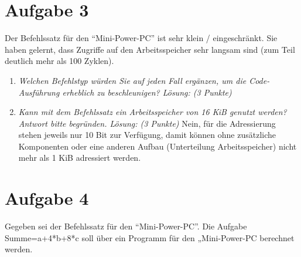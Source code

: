 \documentclass[10pt]{article}
\begin{document}
\section*{Aufgabe 3}
Der Befehlssatz für den "`Mini-Power-PC"' ist sehr klein / eingeschränkt. Sie haben gelernt, dass Zugriffe auf den Arbeitsspeicher sehr langsam sind (zum Teil deutlich mehr als 100 Zyklen).

\begin{enumerate}[label=\alph*)]
	\item
		\textit{Welchen Befehlstyp würden Sie auf jeden Fall ergänzen, um die Code-Ausführung erheblich zu beschleunigen? Lösung: (3 Punkte)}
		
	\item
		\textit{Kann mit dem Befehlssatz ein Arbeitsspeicher von 16 KiB genutzt werden? Antwort bitte begründen. Lösung: (3 Punkte)}
		Nein, für die Adressierung stehen jeweils nur 10 Bit zur Verfügung, damit können ohne zusätzliche Komponenten oder eine anderen Aufbau (Unterteilung Arbeitsspeicher) nicht mehr als 1 KiB adressiert werden.
			
\end{enumerate}

\section*{Aufgabe 4}
Gegeben sei der Befehlssatz für den "`Mini-Power-PC"'. Die Aufgabe Summe=a+4*b+8*c soll über ein Programm für den „Mini-Power-PC berechnet werden.

\end{document}
